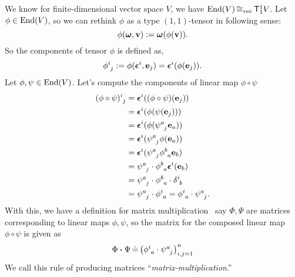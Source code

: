 We know for finite-dimensional vector space \(V\), we have \(\operatorname{End}(V) \operatorname{\cong_{\text{vec}}} \mathsf{T}^1_1 V\). Let \(\phi \in \operatorname{End}(V)\), so we can rethink \(\phi\) as a type \((1, 1)\)-tensor in following sense:
\begin{equation}
    \phi(\vb*{\omega}, \vb{v}) := \vb*{\omega}(\phi(\vb{v})).
\end{equation}
So the components of tensor \(\phi\) is defined as,
\begin{equation}
    \tensor{\phi}{^{i}_{j}} := \phi(\vb*{\epsilon}^i, \vb{e}_j) = \vb*{\epsilon}^i(\phi(\vb{e}_j)).
\end{equation}
Let \(\phi, \psi \in \operatorname{End}(V)\). Let's compute the components of linear map \(\phi \circ \psi\)
\begin{align*}
    \tensor{(\phi \circ \psi)}{^{i}_{j}} & = \vb*{\epsilon}^i((\phi \circ \psi)(\vb{e}_j))                                                                  \\
                                         & = \vb*{\epsilon}^i(\phi(\psi(\vb{e}_j)))                                                                         \\
                                         & = \vb*{\epsilon}^i(\phi(\tensor{\psi}{^{a}_{j}} \vb{e}_a))                                                       \\
                                         & = \vb*{\epsilon}^i(\tensor{\psi}{^{a}_{j}} \phi(\vb{e}_a))                                                       \\
                                         & = \vb*{\epsilon}^i(\tensor{\psi}{^{a}_{j}} \tensor{\phi}{^{b}_{a}} \vb{e}_b)                                     \\
                                         & = \tensor{\psi}{^{a}_{j}} \cdot \tensor{\phi}{^{b}_{a}} \vb*{\epsilon}^i(\vb{e}_b)                               \\
                                         & = \tensor{\psi}{^{a}_{j}} \cdot \tensor{\phi}{^{b}_{a}} \cdot \tensor{\delta}{^{i}_{b}}                          \\
                                         & = \tensor{\psi}{^{a}_{j}} \cdot \tensor{\phi}{^{i}_{a}} = \tensor{\phi}{^{i}_{a}} \cdot \tensor{\psi}{^{a}_{j}}.
\end{align*}
With this, we have a definition for matrix multiplication \ie\ say \(\Phi, \Psi\) are matrices corresponding to linear maps \(\phi, \psi\), so the matrix for the composed linear map \(\phi \circ \psi\) is given as
\begin{equation}
    \Phi \vdot \Psi \hateq \mqty(\tensor{\phi}{^{i}_{a}} \cdot \tensor{\psi}{^{a}_{j}})_{i, j = 1}^{n}
\end{equation}
We call this rule of producing matrices ``\emph{matrix-multiplication}.''

